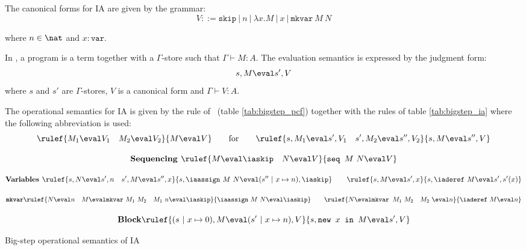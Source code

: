 %


The canonical forms for IA are given by the grammar:
$$ V ::= \texttt{skip}\ |\ n\ |\ \lambda x. M\ |\ x\ |\  \texttt{mkvar}\ M\ N$$

where $n \in \nat$ and $x: \texttt{var}$.


In \ialgol, a program is a term together with a $\Gamma$-store such
that $\Gamma \vdash M : A$. The evaluation semantics is expressed by
the judgment form:
$$s,M \eval s', V$$
where $s$ and $s'$ are $\Gamma$-stores, $V$ is a canonical form and $\Gamma \vdash V : A$.

The operational semantics for IA is given by the rule of \pcf\ (table \ref{tab:bigstep_pcf})
together with the rules of table \ref{tab:bigstep_ia} where the following abbreviation is used:
$$ \rulef{M_1 \eval V_1 \quad M_2 \eval V_2}{M \eval V} \qquad \mbox{for} \qquad
  \rulef{s,M_1 \eval s',V_1 \quad s', M_2 \eval s'',V_2 }{s,M \eval s'',V}
$$


\begin{table}[htbp]
$$\mbox{\textbf{Sequencing }}
    \rulef{M \eval \iaskip \quad N \eval V}{\texttt{seq } M\ N \eval V}
$$

$$\mbox{\textbf{Variables }}
    \rulef{s,N \eval s',n \quad s',M \eval s'',x}{s, \iaassign\ M\ N \eval (s''\ |\ x \mapsto n),\iaskip}
\qquad
    \rulef{s,M \eval s',x }{s, \iaderef\ M \eval s',s'(x)}$$

$$\mbox{\texttt{\textbf{mkvar}}}
    \rulef{N \eval n \quad M \eval \texttt{mkvar}\ M_1\ M_2 \quad M_1\ n \eval \iaskip}
    {\iaassign\ M\ N \eval \iaskip}
\qquad
    \rulef{N \eval \texttt{mkvar } M_1\ M_2 \quad M_2\ \eval n}
    {\iaderef\ M \eval n}
$$

$$\mbox{\textbf{Block}}
    \rulef{(s\ |\ x \mapsto 0),M \eval (s'\ |\ x \mapsto n),V }
    {s, \texttt{new } x \texttt{ in } M \eval s',V}
$$

\label{tab:bigstep_ia}
\caption{Big-step operational semantics of IA}
\end{table}


